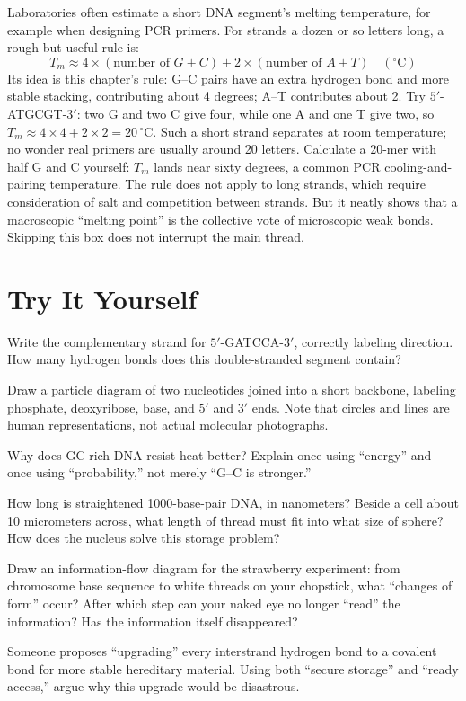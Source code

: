 \begin{tiaozhan}
Laboratories often estimate a short DNA segment's melting temperature, for example when designing PCR primers. For strands a dozen or so letters long, a rough but useful rule is:
\[T_m \approx 4\times (\text{number of }G+C) + 2\times (\text{number of }A+T) \quad (^{\circ}\mathrm{C})\]
Its idea is this chapter's rule: G--C pairs have an extra hydrogen bond and more stable stacking, contributing about 4 degrees; A--T contributes about 2. Try $5'$-ATGCGT-$3'$: two G and two C give four, while one A and one T give two, so $T_m\approx 4\times 4+2\times 2=20\,^{\circ}\mathrm{C}$. Such a short strand separates at room temperature; no wonder real primers are usually around 20 letters. Calculate a 20-mer with half G and C yourself: $T_m$ lands near sixty degrees, a common PCR cooling-and-pairing temperature. The rule does not apply to long strands, which require consideration of salt and competition between strands. But it neatly shows that a macroscopic ``melting point'' is the collective vote of microscopic weak bonds. Skipping this box does not interrupt the main thread.
\end{tiaozhan}

\section*{Try It Yourself}

\begin{sikaoti}
\item Write the complementary strand for $5'$-GATCCA-$3'$, correctly labeling direction. How many hydrogen bonds does this double-stranded segment contain?
\item Draw a particle diagram of two nucleotides joined into a short backbone, labeling phosphate, deoxyribose, base, and $5'$ and $3'$ ends. Note that circles and lines are human representations, not actual molecular photographs.
\item Why does GC-rich DNA resist heat better? Explain once using ``energy'' and once using ``probability,'' not merely ``G--C is stronger.''
\item How long is straightened 1000-base-pair DNA, in nanometers? Beside a cell about 10 micrometers across, what length of thread must fit into what size of sphere? How does the nucleus solve this storage problem?
\item Draw an information-flow diagram for the strawberry experiment: from chromosome base sequence to white threads on your chopstick, what ``changes of form'' occur? After which step can your naked eye no longer ``read'' the information? Has the information itself disappeared?
\item Someone proposes ``upgrading'' every interstrand hydrogen bond to a covalent bond for more stable hereditary material. Using both ``secure storage'' and ``ready access,'' argue why this upgrade would be disastrous.
\end{sikaoti}
